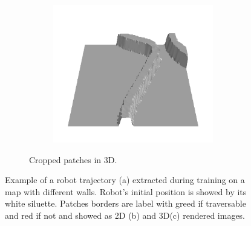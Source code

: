\documentclass[../document.tex]{subfiles}
\begin{document}
\begin{figure}[h]
\begin{subfigure}[b]{1\textwidth}
\begin{subfigure}[b]{0.19\textwidth}
    \includegraphics[width=\linewidth]{../img/bars1-example-patches/3d/14.png}    
    \end{subfigure}  
\caption{Cropped patches in 3D.}
\end{subfigure}
\caption{Example of a robot trajectory (a) extracted during training on a map with different walls. Robot's initial position is showed by its white siluette. Patches borders are label with greed if traversable and red if not and showed as 2D (b) and 3D(c) rendered images.}
\end{figure}
\end{document}
